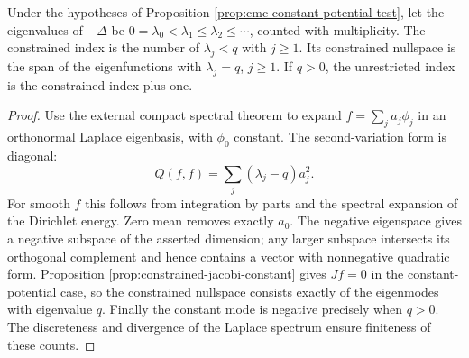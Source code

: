 \begin{proposition}\label{prop:cmc-constant-potential-index}
Under the hypotheses of Proposition \ref{prop:cmc-constant-potential-test}, let the eigenvalues of $-\Delta$ be $0=\lambda_0<\lambda_1\leq\lambda_2\leq\cdots$, counted with multiplicity. The constrained index is the number of $\lambda_j<q$ with $j\geq1$. Its constrained nullspace is the span of the eigenfunctions with $\lambda_j=q$, $j\geq1$. If $q>0$, the unrestricted index is the constrained index plus one.
\end{proposition}
\begin{proof}
Use the external compact spectral theorem to expand $f=\sum_j a_j\phi_j$ in an orthonormal Laplace eigenbasis, with $\phi_0$ constant. The second-variation form is diagonal:
\[
 Q(f,f)=\sum_j(\lambda_j-q)a_j^2.
\]
For smooth $f$ this follows from integration by parts and the spectral expansion of the Dirichlet energy. Zero mean removes exactly $a_0$. The negative eigenspace gives a negative subspace of the asserted dimension; any larger subspace intersects its orthogonal complement and hence contains a vector with nonnegative quadratic form. Proposition \ref{prop:constrained-jacobi-constant} gives $Jf=0$ in the constant-potential case, so the constrained nullspace consists exactly of the eigenmodes with eigenvalue $q$. Finally the constant mode is negative precisely when $q>0$. The discreteness and divergence of the Laplace spectrum ensure finiteness of these counts.
\end{proof}
